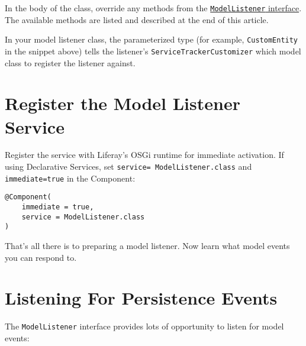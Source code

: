 In the body of the class, override any methods from the
\href{https://docs.liferay.com/dxp/portal/7.2-latest/javadocs/portal-kernel/com/liferay/portal/kernel/model/ModelListener.html}{\texttt{ModelListener}
interface}. The available methods are listed and described at the end of
this article.

In your model listener class, the parameterized type (for example,
\texttt{CustomEntity} in the snippet above) tells the listener's
\texttt{ServiceTrackerCustomizer} which model class to register the
listener against.

\section{Register the Model Listener
Service}\label{register-the-model-listener-service}

Register the service with Liferay's OSGi runtime for immediate
activation. If using Declarative Services, set
\texttt{service=\ ModelListener.class} and \texttt{immediate=true} in
the Component:

\begin{verbatim}
@Component(
    immediate = true,
    service = ModelListener.class
)
\end{verbatim}

That's all there is to preparing a model listener. Now learn what model
events you can respond to.

\section{Listening For Persistence
Events}\label{listening-for-persistence-events}

The \texttt{ModelListener} interface provides lots of opportunity to
listen for model events:

